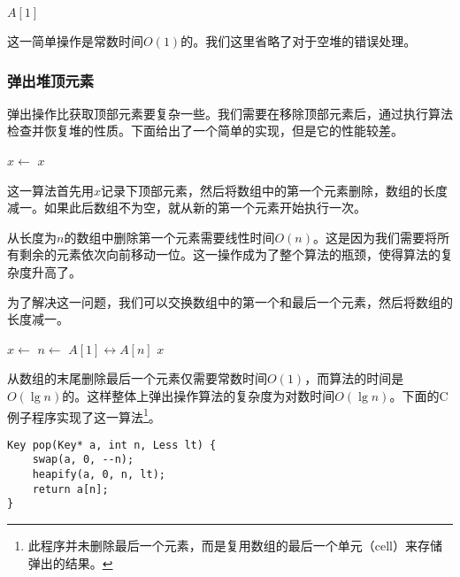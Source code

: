 \documentclass[UTF8]{article}
\begin{document}
\begin{algorithmic}[1]
  \State \Return $A[1]$
\EndFunction
\end{algorithmic}

这一简单操作是常数时间$O(1)$的。我们这里省略了对于空堆的错误处理。

\subsubsection{弹出堆顶元素}

弹出操作比获取顶部元素要复杂一些。我们需要在移除顶部元素后，通过执行算法检查并恢复堆的性质。下面给出了一个简单的实现，但是它的性能较差。

\begin{algorithmic}[1]
  \State $x \gets$ 
  \State {}
    \State {}
  \EndIf
  \State \Return $x$
\EndFunction
\end{algorithmic}

这一算法首先用$x$记录下顶部元素，然后将数组中的第一个元素删除，数组的长度减一。如果此后数组不为空，就从新的第一个元素开始执行一次。

从长度为$n$的数组中删除第一个元素需要线性时间$O(n)$。这是因为我们需要将所有剩余的元素依次向前移动一位。这一操作成为了整个算法的瓶颈，使得算法的复杂度升高了。

为了解决这一问题，我们可以交换数组中的第一个和最后一个元素，然后将数组的长度减一。

\begin{algorithmic}[1]
  \State $x \gets$ 
  \State $n \gets$ 
  \State {} $A[1] \leftrightarrow A[n]$
  \State {}
    \State {}
  \EndIf
  \State \Return $x$
\EndFunction
\end{algorithmic}

从数组的末尾删除最后一个元素仅需要常数时间$O(1)$，而算法的时间是$O(\lg n)$的。这样整体上弹出操作算法的复杂度为对数时间$O(\lg n)$。下面的C例子程序实现了这一算法\footnote{此程序并未删除最后一个元素，而是复用数组的最后一个单元（cell）来存储弹出的结果。}。

\lstset{language=C}
\begin{lstlisting}
Key pop(Key* a, int n, Less lt) {
    swap(a, 0, --n);
    heapify(a, 0, n, lt);
    return a[n];
}
\end{lstlisting}
\end{document}
